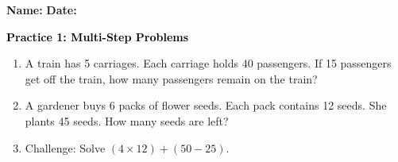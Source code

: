 \documentclass[12pt, letterpaper, fleqn]{article}
\begin{document}
\textbf{Name:} \underline{\hspace{5cm}}
\hfill
\textbf{Date:} \underline{\hspace{3cm}}\\

\begin{tcolorbox}[colback=customteal!20]
    \large\textcolor{black}{\textbf{Practice 1: Multi-Step Problems}}
\end{tcolorbox}

\vspace{5mm}
\begin{enumerate}[itemsep=3.5cm, leftmargin=0.6cm]
\item A train has 5 carriages. Each carriage holds 40 passengers. If 15 passengers get off the train, how many passengers remain on the train?
\vspace{3.5cm}

\item A gardener buys 6 packs of flower seeds. Each pack contains 12 seeds. She plants 45 seeds. How many seeds are left?
\vspace{3.5cm}

\item Challenge: Solve $(4 \times 12) + (50 - 25)$.
\end{enumerate}
\end{document}

